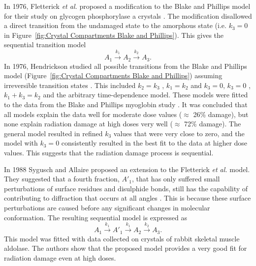         In 1976, Fletterick \textit{et al.} proposed a modification to the Blake and Phillips model for their study on  glycogen phosphorylase a crystals \cite{fletterick1976low}.
        The modification disallowed a direct transition from the undamaged state to the amorphous state (i.e. $k_3 = 0$ in Figure~\ref{fig:Crystal Compartments Blake and Phillips}). This gives the sequential transition model
        \begin{equation}
            A_1 \xrightarrow{k_1} A_2 \xrightarrow{k_2} A_3.
        \end{equation}
        In 1976, Hendrickson studied all possible transitions from the Blake and Phillips model (Figure~\ref{fig:Crystal Compartments Blake and Phillips}) assuming irreversible transition states \cite{hendrickson1976}.
        This included $k_2 = k_3$ \cite{hendrickson1973}, $k_1 = k_2$ and $k_3 = 0$, $k_3 = 0$ \cite{fletterick1976low}, $k_1 + k_3 = k_2$ and the arbitrary time-dependence model.
        These models were fitted to the data from the Blake and Phillips myoglobin study \cite{blake1962}.
        It was concluded that all models explain the data well for moderate dose values ($\approx$ 26\% damage), but none explain radiation damage at high doses very well ($\approx$ 72\% damage).
        The general model resulted in refined $k_3$ values that were very close to zero, and the model with $k_3 = 0$ consistently resulted in the best fit to the data at higher dose values.
        This suggests that the radiation damage process is sequential.
        
		In 1988 Sygusch and Allaire proposed an extension to the Fletterick \textit{et al.} model.
        They suggested that a fourth fraction, $A'_1$, that has only suffered small perturbations of surface residues and disulphide bonds, still has the capability of contributing to diffraction that occurs at all angles \cite{sygusch1988}.
        This is because these surface perturbations are caused before any significant changes in molecular conformation.
        The resulting sequential model is expressed as
        \begin{equation}
            A_1 \xrightarrow{k_1} A'_1 \xrightarrow{k_1} A_2 \xrightarrow{k_2} A_3.
        \end{equation}
        This model was fitted with data collected on crystals of rabbit skeletal muscle aldolase. The authors show that the proposed model provides a very good fit for radiation damage even at high doses.

